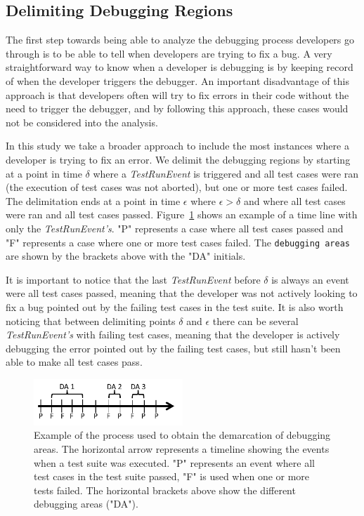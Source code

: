 \documentclass[sigconf]{acmart}
\begin{document}
\subsection{Delimiting Debugging Regions}
The first step towards being able to analyze the debugging
process developers go through is to be able to tell when
developers are trying to fix a bug. A very straightforward 
way to know when a developer is debugging is by keeping
record of when the developer triggers the debugger. An important
disadvantage of this approach is that 
developers often will try to fix errors in their code without the
need to trigger the debugger, and by following this approach,
these cases would not
be considered into the analysis.

In this study we take a broader approach to include the most 
instances where a developer is trying to fix an error.
We delimit the debugging regions by starting at a point
in time $\delta$ where a \textit{TestRunEvent} is triggered and 
all test cases were ran (the execution of test cases
was not aborted), but one or more test cases failed.
The delimitation ends at a point in time $\epsilon $ where $ \epsilon > \delta$ 
and where all test cases were ran and all test cases passed.
Figure~\ref{demarcations} shows an example of a time line
with only the \textit{TestRunEvent's}. "P" represents a case
where all test cases passed and "F" represents a case where one
or more test cases failed. The \texttt{debugging areas} are shown by
the brackets above with the "DA" initials. 


It is important to notice that the last \textit{TestRunEvent} before $\delta$ 
is always an event were all test cases passed, meaning that the
developer was not actively looking to fix a bug pointed out by the
failing test cases in the test suite. It is also worth noticing
that between delimiting points $\delta$ and $\epsilon$ there can be 
several \textit{TestRunEvent's} with failing test cases, meaning
that the developer is actively debugging the error pointed out
by the failing test cases, but still hasn't been able to make
all test cases pass.

\begin{figure}[h]
\label{demarcations}
\caption{Example of the process used to obtain the demarcation of
debugging areas. The horizontal arrow represents a timeline showing
the events when a test suite was executed. "P" 
represents an event where all test cases in the test suite
passed, "F" is used when one or more tests failed. The horizontal brackets
above show the different debugging areas ("DA").}
\centering
\includegraphics[width=0.5\textwidth]{images/demarcations.png}
\end{figure}
\end{document}
